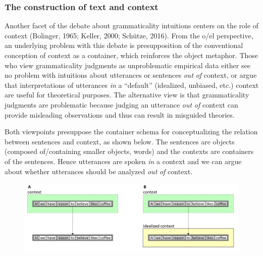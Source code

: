 \subsubsection{The construction of text and context}

Another facet of the debate about grammaticality intuitions centers on the role of context (Bolinger, 1965; Keller, 2000; Schütze, 2016). From the o/el perspective, an underlying problem with this debate is presupposition of the conventional conception of context as a container, which reinforces the object metaphor. Those who view grammaticality judgments as unproblematic empirical data either  see no problem with intuitions about utterances or sentences \textit{out} \textit{of} context, or  argue that interpretations of utterances \textit{in} a “default” (idealized, unbiased, etc.) context are useful for theoretical purposes. The alternative view is that grammaticality judgments are problematic because judging an utterance \textit{out} \textit{of} context can provide misleading observations and thus can result in misguided theories.

  Both viewpoints presuppose the container schema for conceptualizing the relation between sentences and context, as shown below. The sentences are objects (composed of/containing smaller objects, words) and the contexts are containers of the sentences. Hence utterances are spoken \textit{in} a context and we can argue about whether utterances should be analyzed \textit{out} \textit{of} context.   

  
\begin{figure}
\includegraphics[width=\textwidth]{figures/Tilsen-img120.png}
\caption{\missingcaption}
\label{fig:}
\end{figure}
 


